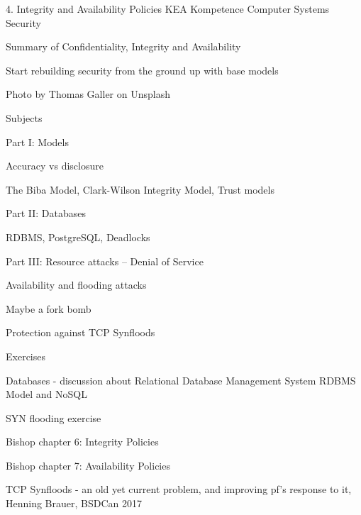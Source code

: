 \documentclass[Screen16to9,17pt]{foils}
\begin{document}
\mytitlepage
{4. Integrity and Availability Policies}
{KEA Kompetence Computer Systems Security \the\year}



 
\begin{list2}
\item Summary of Confidentiality, Integrity and Availability
\item Start rebuilding security from the ground up with base models
\end{list2}

{\small\hfill  Photo by Thomas Galler on Unsplash}


\begin{list1}
\item Subjects
\item Part I: Models
\begin{list2}
\item Accuracy vs disclosure
\item The Biba Model, Clark-Wilson Integrity Model, Trust models
\end{list2}
\item Part II: Databases
\begin{list2}
\item RDBMS, PostgreSQL, Deadlocks
\end{list2}
\item Part III: Resource attacks -- Denial of Service
\begin{list2}
\item Availability and flooding attacks
\item Maybe a fork bomb
\item Protection against TCP Synfloods
\end{list2}
\item Exercises
\begin{list2}
\item Databases - discussion about Relational Database Management System RDBMS Model and NoSQL
\item SYN flooding exercise
\end{list2}
\end{list1}




\begin{list1}
\item Bishop chapter 6: Integrity Policies
\item Bishop chapter 7: Availability Policies
\item TCP Synfloods - an old yet current problem, and improving pf's response to it, Henning Brauer, BSDCan 2017
\end{list1}
\end{document}
